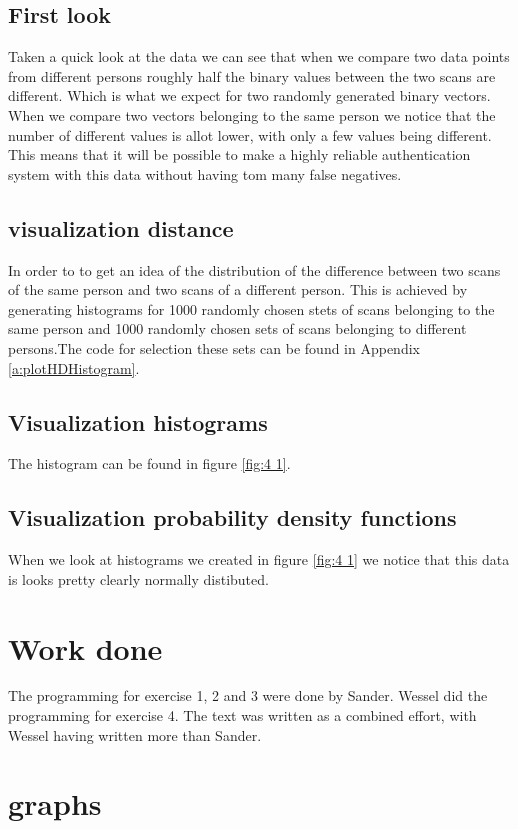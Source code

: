 \documentclass[10pt,a4paper]{article}
\begin{document}
\subsection{First look}
Taken a quick look at the data we can see that when we compare two data points from different persons roughly half the binary values between the two scans are different. Which is what we expect for two randomly generated binary vectors. When we compare two vectors belonging to the same person we notice that the number of different values is allot lower, with only a few values being different. This means that it will be possible to make a highly reliable authentication system with this data without having tom many false negatives.

\subsection{visualization distance}
In order to to get an idea of the distribution of the difference between two scans of the same person and two scans of a different person. This is achieved by generating histograms for 1000 randomly chosen stets of scans belonging to the same person and 1000 randomly chosen sets of scans belonging to different persons.The code for selection these sets can be found in Appendix \ref{a:plotHDHistogram}. 

\subsection{Visualization histograms}
The histogram can be found in figure \ref{fig:4 1}.

\subsection{Visualization probability density functions}
When we look at histograms we created in figure \ref{fig:4 1} we notice that this data is looks pretty clearly normally distibuted. 
\section{Work done}
The programming for exercise 1, 2 and 3 were done by Sander. Wessel did the programming for exercise 4. The text was written as a combined effort, with Wessel having written more than Sander.

\appendix
\section{graphs}
\end{document}
